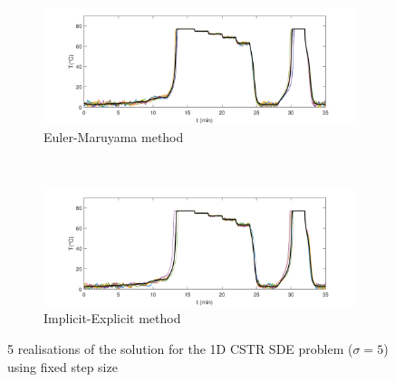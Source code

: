 \vspace{5cm}

\begin{figure}[p]
\centering
    \begin{subfigure}{0.8\linewidth}
        \centering
        \includegraphics[width=1\linewidth]{images/4/4_6_EulerMaruyama_1D.pdf} 
        \caption{Euler-Maruyama method}
    \end{subfigure} \\
    \begin{subfigure}{0.8\linewidth}
        \centering
        \includegraphics[width=1\linewidth]{images/4/4_6_ImplicitExplicit_1D.pdf}
        \caption{Implicit-Explicit method}
    \end{subfigure}
    \caption{5 realisations of the solution for the 1D CSTR SDE problem ($\sigma = 5$) using fixed step size}
    \label{4_6_EM_vs_IE_1D}
\end{figure}